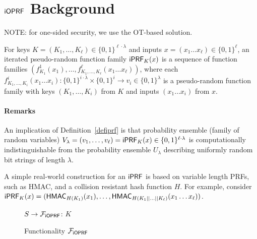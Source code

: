 \section{$\mathsf{i}\mathsf{OPRF}$ Background}
NOTE: for one-sided security, we use the OT-based solution.



\begin{definition}[$\iprf$]\label{defiprf}
  For keys $K=(K_1,\ldots,K_\ell)\in\{0,1\}^{\ell\cdot\lambda}$ and
  inputs $x=(x_1\ldots{}x_\ell)\in\{0,1\}^\ell$, an iterated
  pseudo-random function family $\mathsf{i}\mathsf{PRF}_{K}(x)$ is a sequence of
  function families
  $(f^1_{K_1}(x_{1}),\ldots,f^\ell_{K_1,\ldots,K_\ell}(x_{1}\ldots{}x_{\ell}))$,
  where each
  $f^i_{K_1,\ldots,K_i}(x_{1}\ldots{}x_{i}):\{0,1\}^{i\cdot\lambda}\times\{0,1\}^{i}\rightarrow{}v_i\in\{0,1\}^\lambda$
  is a pseudo-random function family with keys $(K_1,\ldots,K_i)$ from $K$ and
  inputs $(x_1\ldots{}x_i)$ from $x$.
\end{definition}

\paragraph{Remarks}
An implication of Definition~\ref{defiprf} is that probability
ensemble (family of random variables)
$V_\lambda=(v_1,\ldots,v_\ell)=\mathsf{i}\mathsf{PRF}_K(x)\in\{0,1\}^{\ell\cdot\lambda}$
is computationally indistinguishable from the probability ensemble
$U_\lambda$ describing uniformly random bit strings of length
$\lambda$.

A simple real-world construction for an $\iprf$ is based on variable
length PRFs, such as HMAC, and a collision resistant hash function
$H$. For example, consider
$\mathsf{i}\mathsf{PRF}_K(x)=(\mathsf{HMAC}_{H(K_1)}(x_1),\ldots,\mathsf{HMAC}_{H(K_1||\ldots||K_\ell)}(x_1\ldots{}x_\ell))$.


\begin{figure}[tb]
\LinesNumbered
\begin{functionality}[H]
$S\rightarrow{}\mathcal{F}_{\mathsf{i}\mathsf{OPRF}}$: $K$\;
\end{functionality}
\caption{Functionality $\mathcal{F}_{\mathsf{i}\mathsf{OPRF}}$\label{idealioprf}}
\end{figure}

